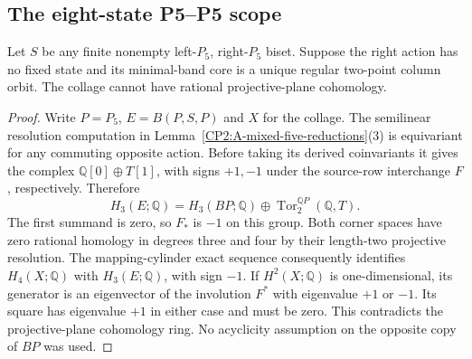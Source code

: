 \subsection{The eight-state P5--P5 scope}

\begin{lemma}
\label{CP2:A-P5-double-unique-core}
Let $S$ be any finite nonempty left-$P_5$, right-$P_5$
biset. Suppose the right action has no fixed state and its
minimal-band core is a unique regular two-point column
orbit. The collage cannot have rational projective-plane
cohomology.
\end{lemma}
\begin{proof}
Write $P=P_5$, $E=B(P,S,P)$ and $X$ for the collage.
The semilinear resolution computation in
Lemma~\ref{CP2:A-mixed-five-reductions}(3) is equivariant
for any commuting opposite action. Before taking its
derived coinvariants it gives the complex
$\mathbb Q[0]\oplus T[1]$, with signs $+1,-1$ under
the source-row interchange $F$, respectively. Therefore
\[
 H_3(E;\mathbb Q)=H_3(BP;\mathbb Q)\oplus
 \operatorname{Tor}^{\mathbb QP}_2(\mathbb Q,T).
\]
The first summand is zero, so $F_*$ is $-1$ on this group.
Both corner spaces have zero rational homology in degrees
three and four by their length-two projective resolution.
The mapping-cylinder exact sequence consequently identifies
$H_4(X;\mathbb Q)$ with $H_3(E;\mathbb Q)$, with sign
$-1$. If $H^2(X;\mathbb Q)$ is one-dimensional, its
generator is an eigenvector of the involution $F^*$ with
eigenvalue $+1$ or $-1$. Its square has eigenvalue $+1$
in either case and must be zero. This contradicts the
projective-plane cohomology ring. No acyclicity assumption
on the opposite copy of $BP$ was used.
\end{proof}

